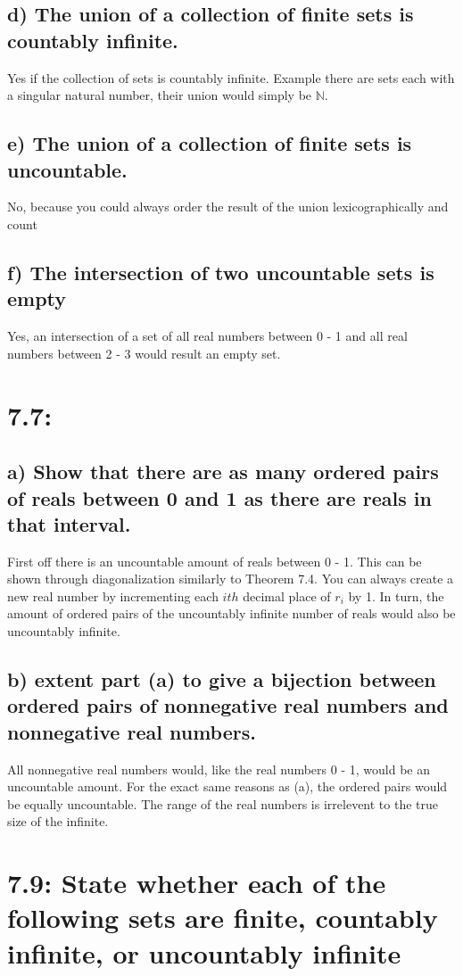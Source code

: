 \documentclass{article}
\begin{document}
\subsection*{d) The union of a collection of finite sets is countably infinite.}
Yes if the collection of sets is countably infinite. Example there are sets each with a singular natural number, their union would simply be $\mathbb{N}$.
\subsection*{e) The union of a collection of finite sets is uncountable.}
No, because you could always order the result of the union lexicographically and count 
\subsection*{f) The intersection of two uncountable sets is empty}
Yes, an intersection of a set of all real numbers between 0 - 1 and all real numbers between 2 - 3 would result an empty set.

\section*{7.7:}
\subsection*{a) Show that there are as many ordered pairs of reals between 0 and 1 as there are reals in that interval.}
First off there is an uncountable amount of reals between 0 - 1. This can be shown through diagonalization similarly to Theorem 7.4. You can always create a new real number by incrementing each $ith$ decimal place of $r_i$ by 1. In turn, the amount of ordered pairs of the uncountably infinite number of reals would also be uncountably infinite. 
\subsection*{b) extent part (a) to give a bijection between ordered pairs of nonnegative real numbers and nonnegative real numbers.}
All nonnegative real numbers would, like the real numbers 0 - 1, would be an uncountable amount. For the exact same reasons as (a), the ordered pairs would be equally uncountable. The range of the real numbers is irrelevent to the true size of the infinite. 

\section*{7.9: State whether each of the following sets are finite, countably infinite, or uncountably infinite}
\end{document}
